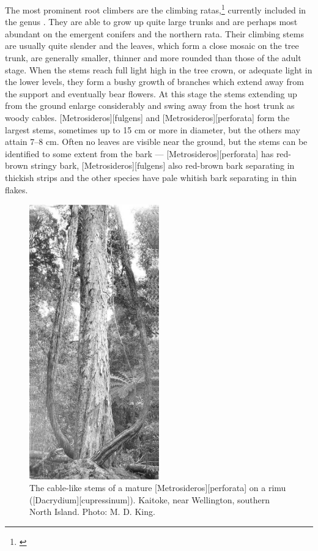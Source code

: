The most prominent root climbers are the climbing ratas,\footnote{\cite{dawson1967growth}} currently included in the genus .
They are able to grow up quite large trunks and are perhaps most abundant on the emergent conifers and the northern rata.
Their climbing stems are usually quite slender and the leaves, which form a close mosaic on the tree trunk, are generally smaller, thinner and more rounded than those of the adult stage.
When the stems reach full light high in the tree crown, or adequate light in the lower levels, they form a bushy growth of branches which extend away from the support and eventually bear flowers.
At this stage the stems extending up from the ground enlarge considerably and swing away from the host trunk as woody cables. [Metrosideros][fulgens] and [Metrosideros][perforata] form the largest stems, sometimes up to 15 cm or more in diameter, but the others may attain 7--8 cm.
Often no leaves are visible near the ground, but the stems can be identified to some extent from the bark --- [Metrosideros][perforata] has red-brown stringy bark, [Metrosideros][fulgens] also red-brown bark separating in thickish strips and the other species have pale whitish bark separating in thin flakes.

\begin{figure}
	\includegraphics[width=0.5\textwidth]{graphics/figure31perforata.jpg}
	\centering
	\caption[A mature \emph{Metrosideros perforata} on a rimu]{The cable-like stems of a mature [Metrosideros][perforata] on a rimu ([Dacrydium][cupressinum]). Kaitoke, near Wellington, southern North Island. Photo: M. D. King.}%
	\label{fig:31perforata}
\end{figure}


